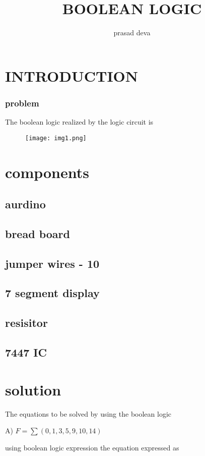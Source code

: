 \documentclass[journal,12pt,twocolumn]{IEEEtran}
\title{BOOLEAN LOGIC}
\author{prasad deva }
\begin{document}
\maketitle

\section{INTRODUCTION}
\subsubsection{problem}
The boolean logic realized by the logic circuit is
\begin{figure}[h]
    \centering
    \texttt{[image: img1.png]}
    
    \caption{}

\end{figure}
\section{components}
\subsection{aurdino}
\subsection{bread board}
\subsection{jumper wires - 10}
\subsection{7 segment display}
\subsection{resisitor}
\subsection{7447 IC}
\bigskip
\section{solution}
The equations to be solved by using the boolean logic 
\bigskip

A) $F =\sum(0,1,3,5,9,10,14)$
\bigskip
 
using boolean logic expression the equation expressed as
\bigskip
\end{document}
